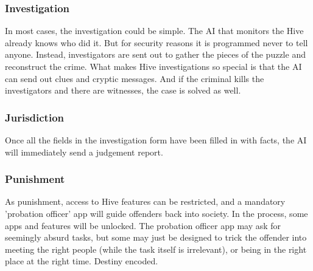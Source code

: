 \subsubsection{Investigation}

In most cases, the investigation could be simple. The AI that monitors the Hive already knows who did it. But for security reasons it is programmed never to tell anyone. Instead, investigators are sent out to gather the pieces of the puzzle and reconstruct the crime.
What makes Hive investigations so special is that the AI can send out clues and cryptic messages. And if the criminal kills the investigators and there are witnesses, the case is solved as well.

\subsubsection{Jurisdiction}

Once all the fields in the investigation form have been filled in with facts, the AI will immediately send a judgement report.

\subsubsection{Punishment}

As punishment, access to Hive features can be restricted, and a mandatory 'probation officer' app will guide offenders back into society. In the process, some apps and features will be unlocked. The probation officer app may ask for seemingly absurd tasks, but some may just be designed to trick the offender into meeting the right people (while the task itself is irrelevant), or being in the right place at the right time. Destiny encoded.


